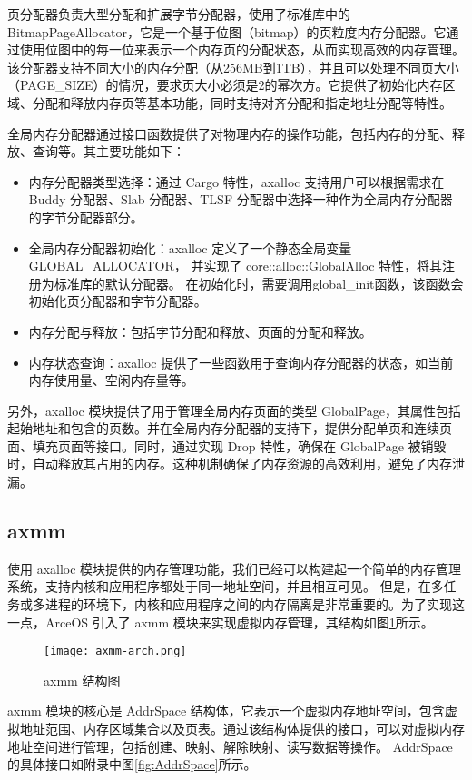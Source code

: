页分配器负责大型分配和扩展字节分配器，使用了标准库中的 BitmapPageAllocator，它是一个基于位图（bitmap）的页粒度内存分配器。它通过使用位图中的每一位来表示一个内存页的分配状态，从而实现高效的内存管理。该分配器支持不同大小的内存分配（从256MB到1TB），并且可以处理不同页大小（PAGE\_SIZE）的情况，要求页大小必须是2的幂次方。它提供了初始化内存区域、分配和释放内存页等基本功能，同时支持对齐分配和指定地址分配等特性。

全局内存分配器通过接口函数提供了对物理内存的操作功能，包括内存的分配、释放、查询等。其主要功能如下：
\begin{itemize}
\item 内存分配器类型选择：通过 Cargo 特性，axalloc 支持用户可以根据需求在 Buddy 分配器、Slab 分配器、TLSF 分配器中选择一种作为全局内存分配器的字节分配器部分。
\item 全局内存分配器初始化：axalloc 定义了一个静态全局变量 GLOBAL\_ALLOCATOR，
并实现了 core::alloc::GlobalAlloc 特性，将其注册为标准库的默认分配器。
在初始化时，需要调用global\_init函数，该函数会初始化页分配器和字节分配器。
\item 内存分配与释放：包括字节分配和释放、页面的分配和释放。
\item 内存状态查询：axalloc 提供了一些函数用于查询内存分配器的状态，如当前内存使用量、空闲内存量等。
\end{itemize}

另外，axalloc 模块提供了用于管理全局内存页面的类型 GlobalPage，其属性包括起始地址和包含的页数。并在全局内存分配器的支持下，提供分配单页和连续页面、填充页面等接口。同时，通过实现 Drop 特性，确保在 GlobalPage 被销毁时，自动释放其占用的内存。这种机制确保了内存资源的高效利用，避免了内存泄漏。

\subsection{axmm}

使用 axalloc 模块提供的内存管理功能，我们已经可以构建起一个简单的内存管理系统，支持内核和应用程序都处于同一地址空间，并且相互可见。
但是，在多任务或多进程的环境下，内核和应用程序之间的内存隔离是非常重要的。为了实现这一点，ArceOS 引入了 axmm 模块来实现虚拟内存管理，其结构如图\ref{fig:axmm-arch}所示。

\begin{figure}
  \centering
  \texttt{[image: axmm-arch.png]}
  \caption{axmm 结构图}
  \label{fig:axmm-arch}
\end{figure}


axmm 模块的核心是 AddrSpace 结构体，它表示一个虚拟内存地址空间，包含虚拟地址范围、内存区域集合以及页表。通过该结构体提供的接口，可以对虚拟内存地址空间进行管理，包括创建、映射、解除映射、读写数据等操作。
AddrSpace 的具体接口如附录中图\ref{fig:AddrSpace}所示。

